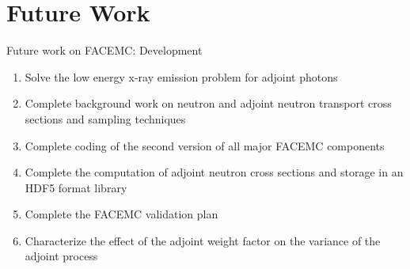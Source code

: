 \documentclass{beamer}
\begin{document}
\section{Future Work}
\begin{frame}{Future work on FACEMC: Development}

  \begin{enumerate}
    \item Solve the low energy x-ray emission problem for adjoint photons
      \medskip
    \item Complete background work on neutron and adjoint neutron transport 
      cross sections and sampling techniques
      \medskip
    \item Complete coding of the second version of all major FACEMC 
      components 
      \medskip
    \item Complete the computation of adjoint neutron cross sections and 
      storage in an HDF5 format library
      \medskip
    \item Complete the FACEMC validation plan
      \medskip
    \item Characterize the effect of the adjoint weight factor on the 
      variance of the adjoint process
  \end{enumerate}

\end{frame}
\end{document}
